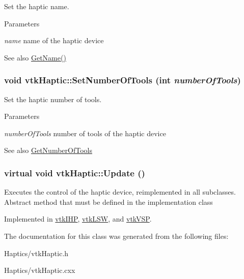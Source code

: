 Set the haptic name. 
\begin{DoxyParams}{Parameters}
\item[{\em name}]name of the haptic device \end{DoxyParams}
\begin{DoxySeeAlso}{See also}
\hyperlink{classvtkHaptic_abdf00bb1f22ee8c984982c4e90c729a5}{GetName()} 
\end{DoxySeeAlso}
\hypertarget{classvtkHaptic_a2c0be36812179261262d89ae91c31013}{
\subsubsection[{SetNumberOfTools}]{\setlength{\rightskip}{0pt plus 5cm}void vtkHaptic::SetNumberOfTools (int {\em numberOfTools})}}
\label{classvtkHaptic_a2c0be36812179261262d89ae91c31013}


Set the haptic number of tools. 
\begin{DoxyParams}{Parameters}
\item[{\em numberOfTools}]number of tools of the haptic device \end{DoxyParams}
\begin{DoxySeeAlso}{See also}
\hyperlink{classvtkHaptic_a6572234c6e1448d8244d1ae7ebad4985}{GetNumberOfTools} 
\end{DoxySeeAlso}
\hypertarget{classvtkHaptic_ae05171fc9104c679ebd3bad356104fdb}{
\subsubsection[{Update}]{\setlength{\rightskip}{0pt plus 5cm}virtual void vtkHaptic::Update ()}}
\label{classvtkHaptic_ae05171fc9104c679ebd3bad356104fdb}


Executes the control of the haptic device, reimplemented in all subclasses. Abstract method that must be defined in the implementation class 

Implemented in \hyperlink{classvtkIHP_a0777ce95f933e80ccfb47f4ebadcf1ec}{vtkIHP}, \hyperlink{classvtkLSW_ade67f3385b72c50988016692a03e97ae}{vtkLSW}, and \hyperlink{classvtkVSP_a84afcaaf6dab2a0fe19b7021e44796e7}{vtkVSP}.

The documentation for this class was generated from the following files:\begin{DoxyCompactItemize}
\item 
Haptics/vtkHaptic.h\item 
Haptics/vtkHaptic.cxx\end{DoxyCompactItemize}
